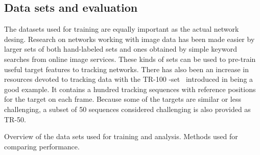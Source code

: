 \subsection{Data sets and evaluation}
The datasets used for training are equally important as the actual network desing. %
Research on networks working with image data has been made easier by larger sets of both
hand-labeled sets and ones obtained by simple keyword searches from online image services.
These kinds of sets can be used to pre-train useful target features to tracking networks.
    There has also been an increase in resources devoted to tracking data with the
TR-100 -set~\cite{VTB} introduced in being a good example. It contains a hundred tracking
sequences with reference positions for the target on each frame. Because some of the
targets are similar or less challenging, a subset of 50 sequences considered challenging
is also provided as TR-50.~\cite{OT_BENCH}

Overview of the data sets used for training and analysis.
Methods used for comparing performance.
